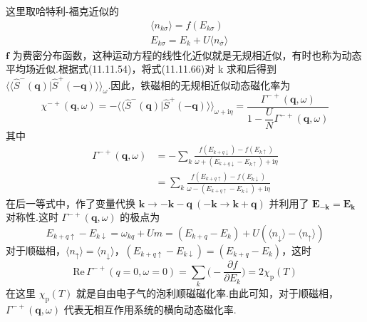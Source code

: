 这里取哈特利-福克近似的
\begin{equation}
\begin{aligned}
  &\langle n_{k\sigma}\rangle=f(E_{k\sigma})\\
  &E_{k\sigma}=E_{k}+U\langle n_{\overline{\sigma}}\rangle
\end{aligned}
\end{equation}
$\boldsymbol{f}$ 为费密分布函数，这种运动方程的线性化近似就是无规相近似，有时也称为动态平均场近似.根据式(11.11.54)，将式(11.11.66)对 k 求和后得到 $\langle\langle\hat{S}^{-}(\boldsymbol{q})|\hat{S}^{+}(-\boldsymbol{q})\rangle\rangle_{\omega}$.因此，铁磁相的无规相近似动态磁化率为
\begin{equation}
  \chi^{-+}(\boldsymbol{q},\omega)=-\langle\langle\hat{S}^{-}(\boldsymbol{q})|\hat{S}^{+}(-\boldsymbol{q})\rangle\rangle_{\omega+\mathrm{i}\eta}
  =\frac{\Gamma^{-+}(\boldsymbol{q},\omega)}{1-\dfrac{U}{N}\Gamma^{-+}(\boldsymbol{q},\omega)}
\end{equation}
其中
\begin{equation}
\begin{aligned}
  \Gamma^{-+}(\boldsymbol{q},\omega)&=-\sum_{k}\frac{f(E_{k+q\downarrow})-f(E_{k\uparrow})}
  {\omega+(E_{k+q\downarrow}-E_{k\uparrow})+\mathrm{i}\eta}\\
  &=\sum_{k}\frac{f(E_{k+q\uparrow})-f(E_{k\downarrow})}
  {\omega-(E_{k+q\uparrow}-E_{k\downarrow})+\mathrm{i}\eta}
\end{aligned}
\end{equation}
在后一等式中，作了变量代换 $\boldsymbol{k}\to-\boldsymbol{k}-\boldsymbol{q}\ (-\boldsymbol{k}\to\boldsymbol{k}+\boldsymbol{q})$ 并利用了 $\boldsymbol{E}_{-\boldsymbol{k}}=\boldsymbol{E}_{\boldsymbol{k}}$ 对称性.这时 $\Gamma^{-+}(\boldsymbol{q},\omega)$ 的极点为
\begin{equation}
  E_{k+q\uparrow}-E_{k\downarrow}=\omega_{kq}+Um
  =(E_{k+q}-E_{k})+U(\langle n_{\downarrow}\rangle-\langle n_{\uparrow}\rangle)
\end{equation}
对于顺磁相，$\langle n_{\uparrow}\rangle=\langle n_{\downarrow}\rangle$，$(E_{k+q\uparrow}-E_{k\downarrow})=(E_{k+q}-E_{k})$，这时
\begin{equation}
  \mathrm{Re}\,\Gamma^{-+}(q=0,\omega=0)=\sum_{k}\biggl(-\frac{\partial f}{\partial E_{k}}\biggr)=2\chi_{\mathrm{p}}(T)
\end{equation}
在这里 $\chi_{\mathrm{p}}(T)$ 就是自由电子气的泡利顺磁磁化率.由此可知，对于顺磁相，$\Gamma^{-+}(\boldsymbol{q},\omega)$ 代表无相互作用系统的横向动态磁化率.

